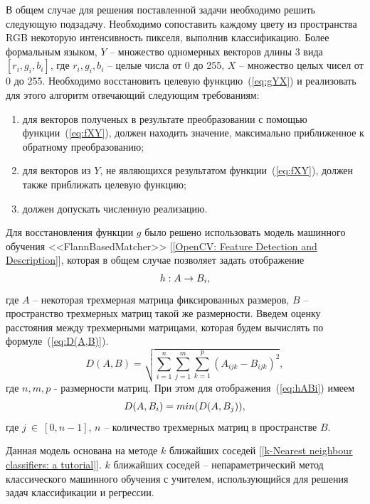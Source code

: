 \documentclass[14pt, a4paper]{extreport}
\begin{document}
	В общем случае для решения поставленной задачи необходимо решить следующую подзадачу. Необходимо сопоставить каждому цвету из пространства RGB некоторую интенсивность пикселя, выполнив классификацию. Более формальным языком, $Y$ -- множество одномерных векторов длины 3 вида $[r_i, g_i, b_i]$, где $r_i, g_i, b_i$ -- целые числа от 0 до 255, $X$ -- множество целых чисел от 0 до 255. Необходимо восстановить целевую функцию~(\ref{eq:gYX}) и реализовать для этого алгоритм отвечающий следующим требованиям:
	\begin{enumerate}[label={\arabic*)}]
		\item для векторов полученых в результате преобразовании с помощью функции~(\ref{eq:fXY}), должен находить значение, максимально приближенное к обратному преобразованию;
		\item для векторов из $Y$, не являющихся результатом функции~(\ref{eq:fXY}), должен также приближать целевую функцию;
		\item должен допускать численную реализацию.
	\end{enumerate}
	
	Для восстановления функции $g$ было решено использовать модель машинного обучения <<FlannBasedMatcher>> [\ref{OpenCV: Feature Detection and Description}], которая в общем случае позволяет задать отображение
	\vspace*{-0.2cm}
	\begin{equation}
		h: A \rightarrow B_i,
		\label{eq:hABi}
		\vspace*{-0.4cm}
	\end{equation}
	где $A$ -- некоторая трехмерная матрица фиксированных размеров, $B$ -- пространство трехмерных матриц такой же размерности. Введем оценку расстояния между трехмерными матрицами, которая будем вычислять по формуле~(\ref{eq:D(A,B)}).
	\begin{equation}
		D(A, B) = \sqrt{\sum\limits_{i=1}^n \sum\limits_{j=1}^m \sum\limits_{k=1}^p (A_{ijk} - B_{ijk})^2},
		\label{eq:D(A,B)}
	\end{equation}
	где $n, m, p$ - размерности матриц. При этом для отображения~(\ref{eq:hABi}) имеем 
	\vspace*{-0.2cm}
	\begin{equation*}
		D(A, B_i) = min(D(A, B_j)), 
		\label{eq:D(A,B_i)}
		\vspace*{-0.4cm}
	\end{equation*}
	где $j~\in~[0, n-1]$, $n$ -- количество трехмерных матриц в пространстве $B$. 
	
	Данная модель основана на методе $k$ ближайших соседей [\ref{k-Nearest neighbour classifiers: a tutorial}]. $k$ ближайших соседей -- непараметрический метод классического машинного обучения с учителем, использующийся для решения задач классификации и регрессии. 
	
\end{document}

